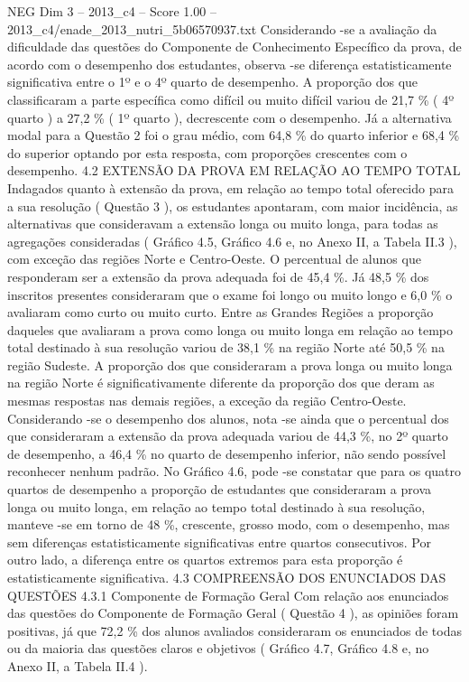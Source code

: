 \begin{textsample}{NEG Dim 3 – 2013\_c4 – Score 1.00 – 2013\_c4/enade\_2013\_nutri\_5b06570937.txt}
Considerando -se a avaliação da dificuldade das questões do Componente de Conhecimento Específico da prova, de acordo com o desempenho dos estudantes, observa -se diferença estatisticamente significativa entre o 1º e o 4º quarto de desempenho.
A proporção dos que classificaram a parte específica como difícil ou muito difícil variou de 21,7 \% ( 4º quarto ) a 27,2 \% ( 1º quarto ), decrescente com o desempenho.
Já a alternativa modal para a Questão 2 foi o grau médio, com 64,8 \% do quarto inferior e 68,4 \% do superior optando por esta resposta, com proporções crescentes com o desempenho. 4.2 EXTENSÃO DA PROVA EM RELAÇÃO AO TEMPO TOTAL Indagados quanto à extensão da prova, em relação ao tempo total oferecido para a sua resolução ( Questão 3 ), os estudantes apontaram, com maior incidência, as alternativas que consideravam a extensão longa ou muito longa, para todas as agregações consideradas ( Gráfico 4.5, Gráfico 4.6 e, no Anexo II, a Tabela II.3 ), com exceção das regiões Norte e Centro-Oeste.
O percentual de alunos que responderam ser a extensão da prova adequada foi de 45,4 \%.
Já 48,5 \% dos inscritos presentes consideraram que o exame foi longo ou muito longo e 6,0 \% o avaliaram como curto ou muito curto.
Entre as Grandes Regiões a proporção daqueles que avaliaram a prova como longa ou muito longa em relação ao tempo total destinado à sua resolução variou de 38,1 \% na região Norte até 50,5 \% na região Sudeste.
A proporção dos que consideraram a prova longa ou muito longa na região Norte é significativamente diferente da proporção dos que deram as mesmas respostas nas demais regiões, a exceção da região Centro-Oeste.
Considerando -se o desempenho dos alunos, nota -se ainda que o percentual dos que consideraram a extensão da prova adequada variou de 44,3 \%, no 2º quarto de desempenho, a 46,4 \% no quarto de desempenho inferior, não sendo possível reconhecer nenhum padrão.
No Gráfico 4.6, pode -se constatar que para os quatro quartos de desempenho a proporção de estudantes que consideraram a prova longa ou muito longa, em relação ao tempo total destinado à sua resolução, manteve -se em torno de 48 \%, crescente, grosso modo, com o desempenho, mas sem diferenças estatisticamente significativas entre quartos consecutivos.
Por outro lado, a diferença entre os quartos extremos para esta proporção é estatisticamente significativa. 4.3 COMPREENSÃO DOS ENUNCIADOS DAS QUESTÕES 4.3.1 Componente de Formação Geral Com relação aos enunciados das questões do Componente de Formação Geral ( Questão 4 ), as opiniões foram positivas, já que 72,2 \% dos alunos avaliados consideraram os enunciados de todas ou da maioria das questões claros e objetivos ( Gráfico 4.7, Gráfico 4.8 e, no Anexo II, a Tabela II.4 ).

\end{textsample}

